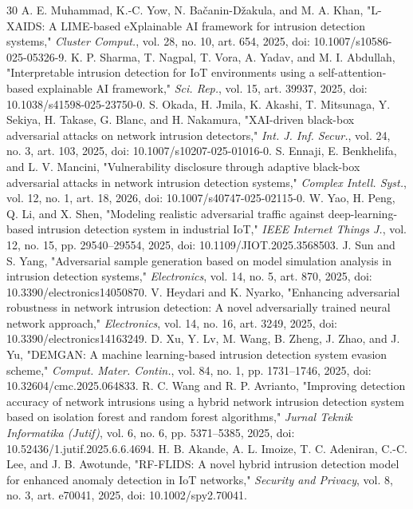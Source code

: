 \begin{small}
\begin{thebibliography}{30}
		A. E. Muhammad, K.-C. Yow, N. Bačanin-Džakula, and M. A. Khan, "L-XAIDS: A LIME-based eXplainable AI framework for intrusion detection systems," \textit{Cluster Comput.}, vol. 28, no. 10, art. 654, 2025, doi: 10.1007/s10586-025-05326-9.
		K. P. Sharma, T. Nagpal, T. Vora, A. Yadav, and M. I. Abdullah, "Interpretable intrusion detection for IoT environments using a self-attention-based explainable AI framework," \textit{Sci. Rep.}, vol. 15, art. 39937, 2025, doi: 10.1038/s41598-025-23750-0.
		S. Okada, H. Jmila, K. Akashi, T. Mitsunaga, Y. Sekiya, H. Takase, G. Blanc, and H. Nakamura, "XAI-driven black-box adversarial attacks on network intrusion detectors," \textit{Int. J. Inf. Secur.}, vol. 24, no. 3, art. 103, 2025, doi: 10.1007/s10207-025-01016-0.
		S. Ennaji, E. Benkhelifa, and L. V. Mancini, "Vulnerability disclosure through adaptive black-box adversarial attacks in network intrusion detection systems," \textit{Complex Intell. Syst.}, vol. 12, no. 1, art. 18, 2026, doi: 10.1007/s40747-025-02115-0.
		W. Yao, H. Peng, Q. Li, and X. Shen, "Modeling realistic adversarial traffic against deep-learning-based intrusion detection system in industrial IoT," \textit{IEEE Internet Things J.}, vol. 12, no. 15, pp. 29540--29554, 2025, doi: 10.1109/JIOT.2025.3568503.
		J. Sun and S. Yang, "Adversarial sample generation based on model simulation analysis in intrusion detection systems," \textit{Electronics}, vol. 14, no. 5, art. 870, 2025, doi: 10.3390/electronics14050870.
		V. Heydari and K. Nyarko, "Enhancing adversarial robustness in network intrusion detection: A novel adversarially trained neural network approach," \textit{Electronics}, vol. 14, no. 16, art. 3249, 2025, doi: 10.3390/electronics14163249.
		D. Xu, Y. Lv, M. Wang, B. Zheng, J. Zhao, and J. Yu, "DEMGAN: A machine learning-based intrusion detection system evasion scheme," \textit{Comput. Mater. Contin.}, vol. 84, no. 1, pp. 1731--1746, 2025, doi: 10.32604/cmc.2025.064833.
		R. C. Wang and R. P. Avrianto, "Improving detection accuracy of network intrusions using a hybrid network intrusion detection system based on isolation forest and random forest algorithms," \textit{Jurnal Teknik Informatika (Jutif)}, vol. 6, no. 6, pp. 5371--5385, 2025, doi: 10.52436/1.jutif.2025.6.6.4694.
		H. B. Akande, A. L. Imoize, T. C. Adeniran, C.-C. Lee, and J. B. Awotunde, "RF-FLIDS: A novel hybrid intrusion detection model for enhanced anomaly detection in IoT networks," \textit{Security and Privacy}, vol. 8, no. 3, art. e70041, 2025, doi: 10.1002/spy2.70041.

\end{thebibliography}
\end{small}
